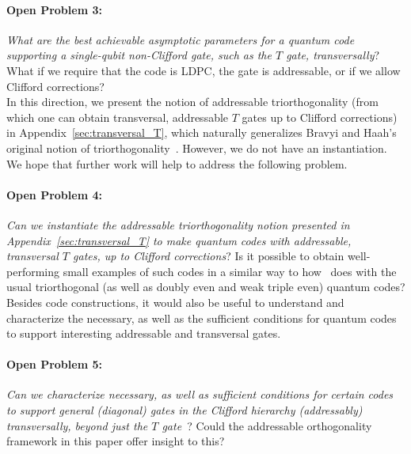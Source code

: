 \documentclass[11pt]{article}
\theoremstyle{definition}
\begin{document}
    \paragraph{Open Problem 3:} {\em What are the best achievable asymptotic parameters for a quantum code supporting a single-qubit non-Clifford gate, such as the $T$ gate, transversally}? What if we require that the code is LDPC, the gate is addressable, or if we allow Clifford corrections?
    \\

    In this direction,
    we present the notion of addressable triorthogonality (from which one can obtain transversal, addressable $T$ gates up to Clifford corrections) in Appendix~\ref{sec:transversal_T}, which naturally generalizes Bravyi and Haah's original notion of triorthogonality~\cite{bravyi2012magic}.
    However,
    we do not have an instantiation. We hope that further work will help to address the following problem.
    
    \paragraph{Open Problem 4:} {\em Can we instantiate the addressable triorthogonality notion presented in Appendix~\ref{sec:transversal_T} to make quantum codes with addressable, transversal $T$ gates, up to Clifford corrections}? Is it possible to obtain well-performing small examples of such codes in a similar way to how~\cite{jain2024high} does with the usual triorthogonal (as well as doubly even and weak triple even) quantum codes?
    \\
    
    Besides code constructions,
    it would also be useful to understand and  characterize the necessary, as well as the sufficient conditions for quantum codes to support interesting addressable and transversal gates.
  
    \paragraph{Open Problem 5:} {\em Can we characterize necessary, as well as sufficient conditions for certain codes to support general (diagonal) gates in the Clifford hierarchy (addressably) transversally, beyond just the $T$ gate}~\cite{rengaswamy2020optimality,Hu2022designingquantum}? Could the addressable orthogonality framework in this paper offer insight to this?
    \\
\end{document}
